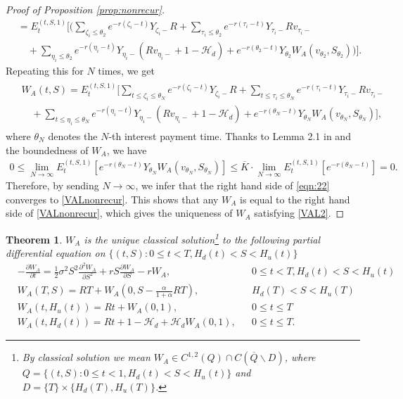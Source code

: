 \documentclass[final,pdftex]{ectaart}
\theoremstyle{plain}
\newtheorem{theorem}{Theorem}[section]
\begin{document}
\begin{appendices}
\begin{proof}[Proof of Proposition \ref{prop:nonrecur}]
\begin{align*}
	&=E_t^{(t,S,1)}\Bigg[\Bigg(\sum_{\zeta_i\le\theta_2}e^{-r(\zeta_i-t)}Y_{\zeta_i-}R+\sum_{\tau_i\le\theta_2}e^{-r(\tau_i-t)}Y_{\tau_i-}Rv_{\tau_i-}\\
	&\quad+\sum_{\eta_i\le\theta_2}e^{-r(\eta_i-t)}Y_{\eta_i-}(Rv_{\eta_i-}+1-\mathcal{H}_d)+e^{-r(\theta_2-t)}Y_{\theta_2} W_A(v_{\theta_2},S_{\theta_2})\Bigg)\Bigg].
	\end{align*}
	Repeating this for $N$ times, we get
	\begin{align}\label{eqn:22}
	\begin{split}
	&W_A(t,S)=E_t^{(t,S,1)}\Bigg[\sum_{t\le \zeta_i\le\theta_N}e^{-r(\zeta_i-t)}Y_{\zeta_i-}R+\sum_{t\le \tau_i\le \theta_N}e^{-r(\tau_i-t)}Y_{\tau_i-}Rv_{\tau_i-}\\
	&\quad+\sum_{t\le\eta_i\le \theta_N}e^{-r(\eta_i-t)}Y_{\eta_i-}(Rv_{\eta_i-}+1-\mathcal{H}_d)+e^{-r(\theta_N-t)}Y_{\theta_N}W_A(v_{\theta_N},S_{\theta_N})\Bigg],
	\end{split}
	\end{align}
	where $\theta_N$ denotes the $N$-th interest payment time. Thanks to Lemma 2.1 in \cite{dai_stochastic_2017} and the boundedness of $W_A$, we have
	\begin{align*}
	0\le \lim_{N\to\infty}E_t^{(t,S,1)}\left[e^{-r(\theta_N-t)}Y_{\theta_N}W_A(v_{\theta_N},S_{\theta_N})\right]\le \overline{K}\cdot\lim_{N\to\infty}E_t^{(t,S,1)}\left[e^{-r(\theta_N-t)}\right]=0.
	\end{align*}
	Therefore, by sending $N\to\infty$, we infer that the right hand side of \eqref{eqn:22} converges to \eqref{VALnonrecur}. This shows that any $W_A$ is equal to the right hand side of \eqref{VALnonrecur}, which gives the uniqueness of $W_A$ satisfying \eqref{VAL2}.
\end{proof}


\begin{theorem}\label{thm:main}
$W_{A}$ is the unique classical solution\footnote{By classical solution we mean $W_{A}\in C^{1,2}(Q)\cap C(\overline{Q}\backslash D)$, where $Q=\{(t,S):0\le t<1,H_{d}(t)<S<H_{u}(t)\}$ and $D=\{T\}\times\{H_{d}(T),H_{u}(T)\}$.} to the following partial differential equation on $\{(t,S):0\le t<T,H_{d}(t)<S<H_{u}(t)\}$
\begin{align}
&-\frac{\partial W_{A}}{\partial t}  =\frac{1}{2}\sigma^{2}S^{2}\frac{\partial^{2}W_{A}}{\partial S^{2}}+r S\frac{\partial W_{A}}{\partial S}-r W_{A},&&0\le t<T,H_d(t)<S<H_u(t)\\
&W_{A}(T,S)  =RT+W_{A}(0,S-\frac{\alpha}{1+\alpha}RT),&&H_d(T)<S<H_u(T)\\
&W_{A}(t,H_{u}(t))  =Rt+W_{A}(0,1),&&0\le t\le T\\
&W_{A}(t,H_d(t))  =Rt+1-\mathcal{H}_{d}+\mathcal{H}_{d}W_{A}(0,1),&&0\le t\le T.
\end{align}
\end{theorem}


\end{appendices}
\end{document}
